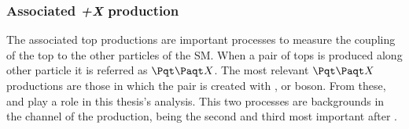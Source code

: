 \subsubsection{Associated \ttbar\textit{+X} production}
\label{sec:Chap1:Top:Production:ttbar_plus_X}
The associated top productions are important processes to measure
the coupling of the top to the other particles of the SM. 
When a pair of tops is produced along other particle 
it is referred as $\ttbar X$. The most relevant $\ttbar X$ productions
are those in which the pair is created with \PW, \PZ or \Pgamma boson.
From these, \ttW and \ttZ play a role in this thesis's analysis.
This two processes are backgrounds in
the \dilepOStau channel of the \tHq production, being the second and third
most important after \ttbar. 
\begin{comment}
\begin{figure}
        \begin{subfigure}[b]{0.25\textwidth}
                \texttt{[image: Chapter1/ttW\_qq\_A]}
                \caption{}
        \end{subfigure}%
        \begin{subfigure}[b]{0.25\textwidth}
                \texttt{[image: Chapter1/ttW\_qq\_B]}
                \caption{}
        \end{subfigure}%
        \begin{subfigure}[b]{0.25\textwidth}
                \texttt{[image: Chapter1/ttW\_gq\_A]}
                \caption{}
        \end{subfigure}%
        \begin{subfigure}[b]{0.25\textwidth}
                \texttt{[image: Chapter1/ttW\_gq\_B]}
                \caption{}
        \end{subfigure}
        \caption{Representative Feynman diagrams for \ttW production.
        Left diagrams show the $\bar{q}q'\rightarrow \ttW$ processes 
        and right ones the $\bar{q}g\rightarrow \ttW q'$ production. \pablo{igual tampoco
        	hace falta enseñar estos diagramas}}\label{fig:Chap1:top:ttX:ttW_Feynman}
\end{figure}
\end{comment}

